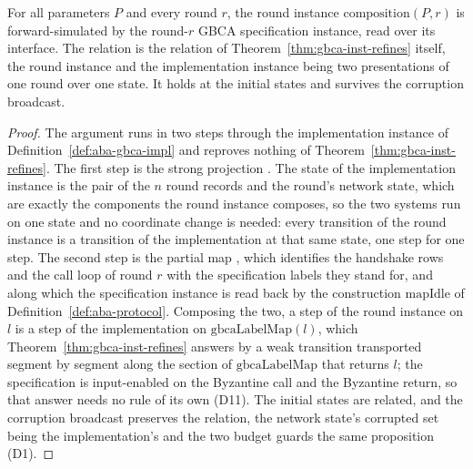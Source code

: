 \begin{theorem}
  \label{thm:aba-subsim}
  \leanok
  For all parameters $P$ and every round $r$, the round instance $\mathrm{composition}(P,r)$ is forward-simulated by the round-$r$ GBCA specification instance, read over its interface.
  The relation is the relation of Theorem~\ref{thm:gbca-inst-refines} itself, the round instance and the implementation instance being two presentations of one round over one state.
  It holds at the initial states and survives the corruption broadcast.
\end{theorem}

\begin{proof}\leanok
  The argument runs in two steps through the implementation instance of Definition~\ref{def:aba-gbca-impl} and reproves nothing of Theorem~\ref{thm:gbca-inst-refines}.
  The first step is the strong projection .
  The state of the implementation instance is the pair of the $n$ round records and the round's network state, which are exactly the components the round instance composes, so the two systems run on one state and no coordinate change is needed: every transition of the round instance is a transition of the implementation at that same state, one step for one step.
  The second step is the partial map , which identifies the handshake rows and the call loop of round $r$ with the specification labels they stand for, and along which the specification instance is read back by the construction $\mathrm{mapIdle}$ of Definition~\ref{def:aba-protocol}.
  Composing the two, a step of the round instance on $l$ is a step of the implementation on $\mathrm{gbcaLabelMap}(l)$, which Theorem~\ref{thm:gbca-inst-refines} answers by a weak transition transported segment by segment along the section of $\mathrm{gbcaLabelMap}$ that returns $l$; the specification is input-enabled on the Byzantine call and the Byzantine return, so that answer needs no rule of its own (D11).
  The initial states are related, and the corruption broadcast preserves the relation, the network state's corrupted set being the implementation's and the two budget guards the same proposition (D1).
\end{proof}
